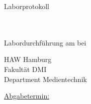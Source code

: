 

\textblockorigin{0mm}{0mm}

\makeatletter
\begin{titlepage}

    
    \begin{center}
        

        \vspace*{0.5cm}
        \large{\@author}
        \vspace*{2cm}

        \large{Laborprotokoll}\\[1ex]
        \Huge{\@title}\\[3ex]

        \Large{\@subtitle}\\[1ex]


        \vspace*{4cm}

        Labordurchführung am \labdate{} bei \betreuer
        \vspace*{1cm}

        
        HAW Hamburg\\
        Fakultät DMI\\
        Department Medientechnik\\


        \vspace*{4cm}

        \normalsize

        \underline{Abgabetermin:} \\
        \abgabetermin

        \vspace*{1cm}

            
    \end{center}
\end{titlepage}
\makeatother
